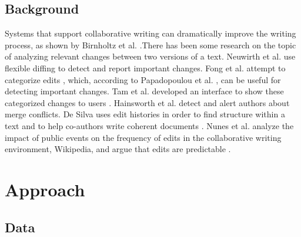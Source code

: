 \subsection{Background}\label{background}

Systems that support collaborative writing can dramatically improve the
writing process, as shown by Birnholtz et al.
\cite{birnholtz2012tracking}.There has been some research on the topic
of analyzing relevant changes between two versions of a text. Neuwirth
et al. use flexible diffing \cite{neuwirth1992flexible} to detect and
report important changes. Fong et al. attempt to categorize edits
\cite{fong2010did}, which, according to Papadopoulou et al.
\cite{papadopoulou2007structured}, can be useful for detecting important
changes. Tam et al. developed an interface to show these categorized
changes to users \cite{tam2006framework}. Hainsworth et al.
\cite{hainsworth2006enabling} detect and alert authors about merge
conflicts. De Silva uses edit histories in order to find structure
within a text and to help co-authors write coherent documents
\cite{de2007narrative}. Nunes et al. analyze the impact of public events
on the frequency of edits in the collaborative writing environment,
Wikipedia, and argue that edits are predictable
\cite{nunes2008wikichanges}.

\section{Approach}\label{approach}

\subsection{Data}\label{data}

